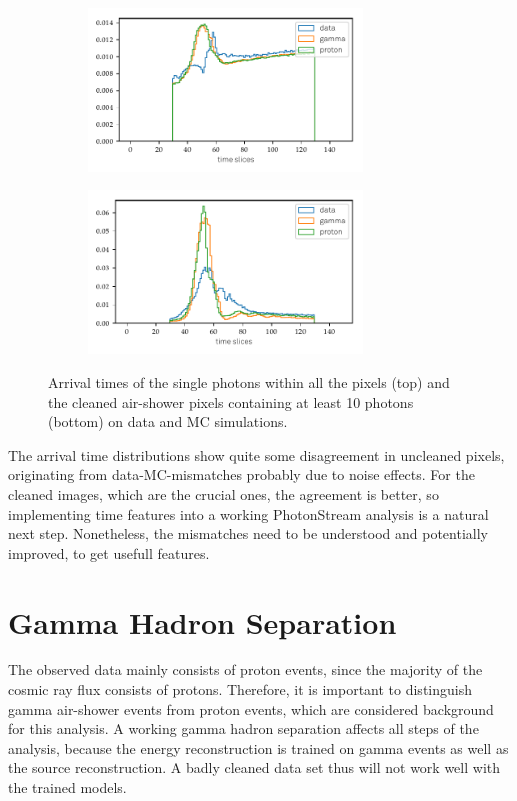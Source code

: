 \begin{figure}
  \begin{subfigure}{\textwidth}
    \centering
    \includegraphics[width=0.8\textwidth]{Plots/all_slices_min_0_per_pixel.pdf}
  \end{subfigure}
  \begin{subfigure}{\textwidth}
    \centering
    \includegraphics[width=0.8\textwidth]{Plots/all_slices_min_10_per_pixel.pdf}
  \end{subfigure}
  \caption{Arrival times of the single photons within all the pixels (top) and the cleaned air-shower pixels containing at least 10 photons (bottom) on data and MC simulations.}
  \label{fig:slices}
\end{figure}
%

The arrival time distributions show quite some disagreement in uncleaned
pixels, originating from data-MC-mismatches probably due to noise effects. For
the cleaned images, which are the crucial ones, the agreement is better, so
implementing time features into a working PhotonStream analysis is a natural
next step. Nonetheless, the mismatches need to be understood and potentially
improved, to get usefull features.

\section{Gamma Hadron Separation}
%
The observed data mainly consists of proton events, since the majority of the
cosmic ray flux consists of protons. Therefore, it is important to distinguish
gamma air-shower events from proton events, which are considered background for
this analysis. A working gamma hadron separation affects all steps of the
analysis, because the energy reconstruction is trained on gamma events as well
as the source reconstruction. A badly cleaned data set thus will not work well
with the trained models.

